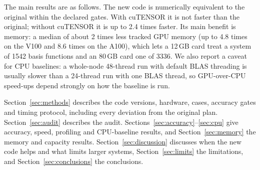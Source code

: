 The main results are as follows. The new code is numerically equivalent to the original within the declared gates. With cuTENSOR it is not faster than the original; without cuTENSOR it is up to 2.4 times faster. Its main benefit is memory: a median of about 2 times less tracked GPU memory (up to 4.8 times on the V100 and 8.6 times on the A100), which lets a 12\,GB card treat a system of 1542 basis functions and an 80\,GB card one of 3336. We also report a caveat for CPU baselines: a whole-node 48-thread run with default BLAS threading is usually slower than a 24-thread run with one BLAS thread, so GPU-over-CPU speed-ups depend strongly on how the baseline is run.

Section~\ref{sec:methods} describes the code versions, hardware, cases, accuracy gates and timing protocol, including every deviation from the original plan. Section~\ref{sec:audit} describes the audit. Sections~\ref{sec:accuracy}--\ref{sec:cpu} give accuracy, speed, profiling and CPU-baseline results, and Section~\ref{sec:memory} the memory and capacity results. Section~\ref{sec:discussion} discusses when the new code helps and what limits larger systems, Section~\ref{sec:limits} the limitations, and Section~\ref{sec:conclusions} the conclusions.
